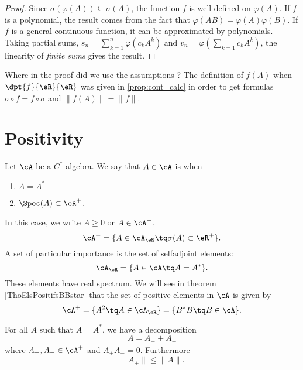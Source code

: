 \begin{proof}
Since $\sigma(\varphi(A))\subseteq\sigma(A)$, the function $f$ is well defined on $\varphi(A)$. If $f$ is a polynomial, the result comes from the fact that $\varphi(AB)=\varphi(A)\varphi(B)$. If $f$ is a general continuous function, it can be approximated by polynomials. Taking partial sums, $s_n=\sum_{k=1}^n\varphi(c_kA^k)$ and $v_n=\varphi(\sum_{k=1}c_kA^k)$, the linearity of \emph{finite sums} gives the result.
\end{proof}

Where in the proof did we use the assumptions ? The definition of $f(A)$ when $\dpt{f}{\eR}{\eR}$ was given in \ref{prop:cont_calc} in order to get formulas $\sigma\circ f=f\circ\sigma$ and $\| f(A) \|=\| f \|$.

\section{Positivity}

Let $\cA$ be a $C^*$-algebra. We say that $A\in\cA$ is  when 
\begin{enumerate}
\item  $A=A^*$
\item  $\Spec(A)\subset\eR^+$.
\end{enumerate}
In this case, we write $A\geq 0$ or $A\in\cA^+$,
\[ 
  \cA^+=\{ A\in\cA_{\eR}\tq\sigma(A)\subset\eR^+ \}.
\]
A set of particular importance is the set of selfadjoint elements:
\begin{equation}
    \cA_{\eR}=\{ A\in\cA\tq A=A^* \}.
\end{equation}
These elements have real spectrum. We will see in theorem \ref{ThoElsPositifsBBstar} that the set of positive elements in $\cA$ is given by
\begin{equation}
    \cA^+=\{ A^2\tq A\in\cA_{\eR} \}=\{ B^*B\tq B\in\cA \}.
\end{equation}

\begin{lemma}
For all $A$ such that $A=A^*$, we have a decomposition
\[ 
  A=A_++A_-
\]
where $A_+,A_-\in\cA^+$ and $A_+A_-=0$. Furthermore
\[ 
  \| A_{\pm} \|\leq \| A \|.
\]
 \label{lem:AsAdecm}
\end{lemma}


